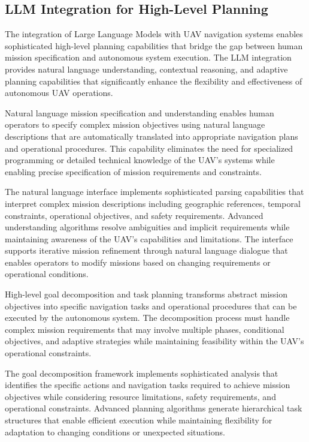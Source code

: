 \subsection{LLM Integration for High-Level Planning}

The integration of Large Language Models with UAV navigation systems enables sophisticated high-level planning capabilities that bridge the gap between human mission specification and autonomous system execution. The LLM integration provides natural language understanding, contextual reasoning, and adaptive planning capabilities that significantly enhance the flexibility and effectiveness of autonomous UAV operations.

Natural language mission specification and understanding enables human operators to specify complex mission objectives using natural language descriptions that are automatically translated into appropriate navigation plans and operational procedures. This capability eliminates the need for specialized programming or detailed technical knowledge of the UAV's systems while enabling precise specification of mission requirements and constraints.

The natural language interface implements sophisticated parsing capabilities that interpret complex mission descriptions including geographic references, temporal constraints, operational objectives, and safety requirements. Advanced understanding algorithms resolve ambiguities and implicit requirements while maintaining awareness of the UAV's capabilities and limitations. The interface supports iterative mission refinement through natural language dialogue that enables operators to modify missions based on changing requirements or operational conditions.

High-level goal decomposition and task planning transforms abstract mission objectives into specific navigation tasks and operational procedures that can be executed by the autonomous system. The decomposition process must handle complex mission requirements that may involve multiple phases, conditional objectives, and adaptive strategies while maintaining feasibility within the UAV's operational constraints.

The goal decomposition framework implements sophisticated analysis that identifies the specific actions and navigation tasks required to achieve mission objectives while considering resource limitations, safety requirements, and operational constraints. Advanced planning algorithms generate hierarchical task structures that enable efficient execution while maintaining flexibility for adaptation to changing conditions or unexpected situations.

